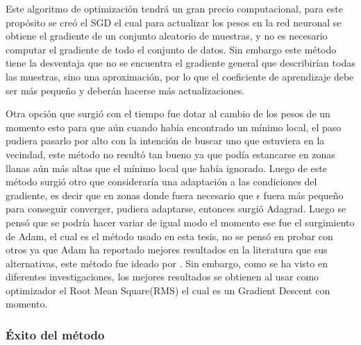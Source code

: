 \par Este algoritmo de optimización tendrá un gran precio computacional, para este propósito se creó el \gls{SGD} el cual para actualizar los pesos en la red neuronal se obtiene el gradiente de un conjunto aleatorio de muestras, y no es necesario computar el gradiente de todo el conjunto de datos. Sin embargo este método tiene la desventaja que no se encuentra el gradiente general que describirían todas las muestras, sino una aproximación, por lo que el coeficiente de aprendizaje debe ser más pequeño y deberán hacerse más actualizaciones.

\par Otra opción que surgió con el tiempo fue dotar al cambio de los pesos de un momento esto para que aún cuando había encontrado un mínimo local, el paso pudiera pasarlo por alto con la intención de buscar uno que estuviera en la vecindad, este método no resultó tan bueno ya que podía estancarse en zonas llanas aún más altas que el mínimo local que había ignorado. Luego de este método surgió otro que consideraría una adaptación a las condiciones del gradiente, es decir que en zonas donde fuera necesario que $\epsilon$ fuera más pequeño para conseguir converger, pudiera adaptarse, entonces surgió Adagrad. Luego se pensó que se podría hacer variar de igual modo el momento ese fue el surgimiento de Adam, el cual es el método usado en esta tesis, no se pensó en probar con otros ya que Adam ha reportado mejores resultados en la literatura que sus alternativas, este método fue ideado por \cite{kingma2014adam}.  Sin embargo, como se ha visto en diferentes investigaciones, los mejores resultados se obtienen al usar como optimizador el Root Mean Square(RMS) el cual es un Gradient Descent con momento.
\nocite{DBLP:journals/corr/Ruder16}
			
\subsubsection{Éxito del método}
			
